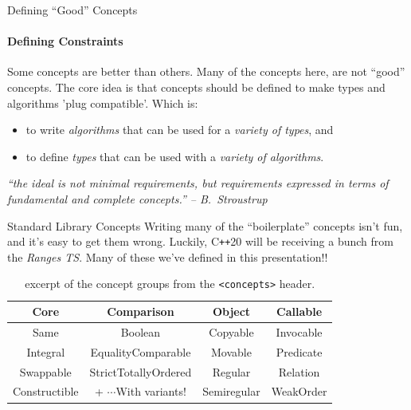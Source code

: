 \documentclass{beamer}
\begin{document}
    \begin{frame}[fragile]{Defining ``Good'' Concepts}
        \framesubtitle{Defining Constraints}
        Some concepts are better than others. Many of the concepts here, are not ``good'' concepts. The core idea is that concepts should be defined to make types and algorithms 'plug compatible'. Which is:\hfill
        \vspace{0.8em}
        \begin{itemize}
            \item{to write \emph{algorithms} that can be used for a \emph{variety of types}, and}
            \item{to define \emph{types} that can be used with a \emph{variety of algorithms}.}
        \end{itemize}
        \begin{center}
        \emph{``the ideal is not minimal requirements, but requirements expressed in terms of fundamental and complete concepts.'' -- B.\ Stroustrup}
        \end{center}
    \end{frame}

    \begin{frame}[fragile]{Standard Library Concepts}
        Writing many of the ``boilerplate'' concepts isn't fun, and it's easy to get them wrong. Luckily, C\texttt{++}20 will be receiving a bunch from the \emph{Ranges TS}. Many of these we've defined in this presentation!!
        \vspace{1em}
        \begin{center}
        \begin{table}
        \begin{tabular}{cccc}
            \toprule
            \textbf{Core} & \textbf{Comparison} & \textbf{Object} & \textbf{Callable}\\
            \midrule
            Same & Boolean & Copyable & Invocable \\
            Integral & EqualityComparable & Movable & Predicate \\
            Swappable & StrictTotallyOrdered  & Regular & Relation \\
            Constructible & + $\cdots$With variants!   & Semiregular & WeakOrder \\
            \bottomrule
        \end{tabular}
        \caption{excerpt of the concept groups from the \texttt{<concepts>} header.}
        \end{table}
        \end{center}
    \end{frame}
\end{document}
